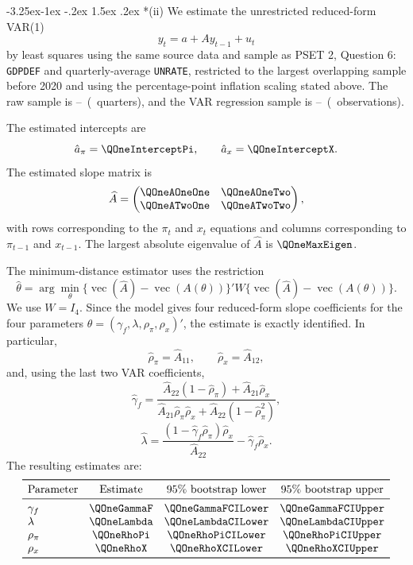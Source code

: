 \documentclass[11pt]{article}
\makeatletter
\renewcommand\subsection{\@startsection{subsection}{2}{\z@}%
  {-3.25ex\@plus -1ex \@minus -.2ex}%
  {1.5ex \@plus .2ex}%
  {\normalfont\large}}
\makeatother
\begin{document}
\subsection*{(ii)}
We estimate the unrestricted reduced-form VAR(1)
\[
y_t=a+A y_{t-1}+u_t
\]
by least squares using the same source data and sample as PSET 2, Question 6:
\texttt{GDPDEF} and quarterly-average \texttt{UNRATE}, restricted to the largest
overlapping sample before 2020 and using the percentage-point inflation scaling stated above.
The raw sample is \QOneRawStart--\QOneRawEnd\ (\QOneRawN\ quarters), and the VAR
regression sample is \QOneVARStart--\QOneVAREnd\ (\QOneVARN\ observations).

The estimated intercepts are
\[
\hat a_\pi=\QOneInterceptPi,
\qquad
\hat a_x=\QOneInterceptX.
\]
The estimated slope matrix is
\[
\widehat A
=
\begin{pmatrix}
\QOneAOneOne & \QOneAOneTwo\\
\QOneATwoOne & \QOneATwoTwo
\end{pmatrix},
\]
with rows corresponding to the \(\pi_t\) and \(x_t\) equations and columns corresponding
to \(\pi_{t-1}\) and \(x_{t-1}\). The largest absolute eigenvalue of \(\widehat A\) is
\(\QOneMaxEigen\).

The minimum-distance estimator uses the restriction
\[
\widehat\theta
=
\arg\min_{\theta}
\{\operatorname{vec}(\widehat A)-\operatorname{vec}(A(\theta))\}'
W
\{\operatorname{vec}(\widehat A)-\operatorname{vec}(A(\theta))\}.
\]
We use \(W=I_4\). Since the model gives four reduced-form slope coefficients for the four
parameters \(\theta=(\gamma_f,\lambda,\rho_\pi,\rho_x)'\), the estimate is exactly
identified. In particular,
\[
\widehat\rho_\pi=\widehat A_{11},
\qquad
\widehat\rho_x=\widehat A_{12},
\]
and, using the last two VAR coefficients,
\[
\widehat\gamma_f
=
\frac{\widehat A_{22}(1-\widehat\rho_\pi)+\widehat A_{21}\widehat\rho_x}
{\widehat A_{21}\widehat\rho_\pi\widehat\rho_x
+\widehat A_{22}(1-\widehat\rho_\pi^2)},
\]
\[
\widehat\lambda
=
\frac{(1-\widehat\gamma_f\widehat\rho_\pi)\widehat\rho_x}{\widehat A_{22}}
-\widehat\gamma_f\widehat\rho_x.
\]
The resulting estimates are:
\[
\begin{array}{lccc}
\toprule
\text{Parameter} & \text{Estimate} & \text{95\% bootstrap lower} & \text{95\% bootstrap upper}\\
\midrule
\gamma_f & \QOneGammaF & \QOneGammaFCILower & \QOneGammaFCIUpper\\
\lambda & \QOneLambda & \QOneLambdaCILower & \QOneLambdaCIUpper\\
\rho_\pi & \QOneRhoPi & \QOneRhoPiCILower & \QOneRhoPiCIUpper\\
\rho_x & \QOneRhoX & \QOneRhoXCILower & \QOneRhoXCIUpper\\
\bottomrule
\end{array}
\]
\end{document}
